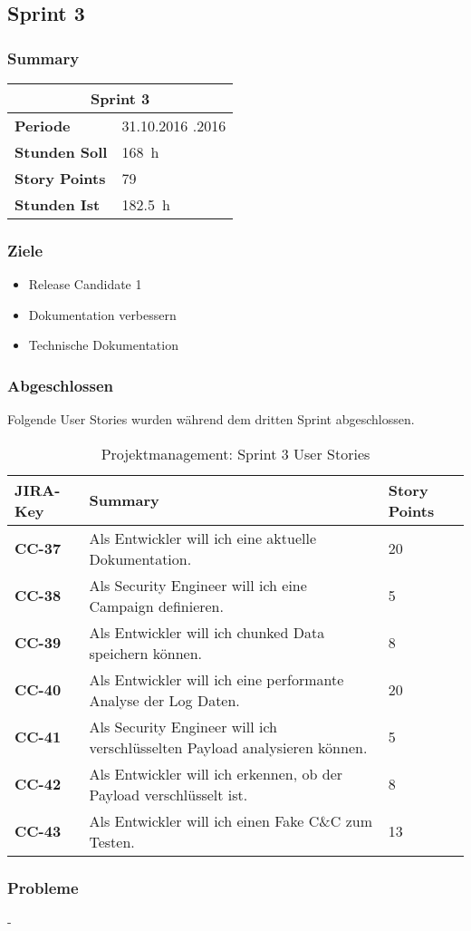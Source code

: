 \subsection{Sprint 3}

\subsubsection*{Summary}

\begin{table}[H]
	\centering
	\begin{tabular}{ll}
		\toprule
		\multicolumn{2}{c}{\textbf{Sprint 3}}\\
		\midrule
		\textbf{Periode} & 31.10.2016 \textendash 20.11.2016\\
		\textbf{Stunden Soll} & \SI{168}{\hour}\\
		\textbf{Story Points} & 79\\
		\textbf{Stunden Ist} & \SI{182,5}{\hour}\\
		\bottomrule
	\end{tabular}
\end{table}

\subsubsection*{Ziele}
\begin{itemize}
  \item Release Candidate 1
  \item Dokumentation verbessern
  \item Technische Dokumentation
\end{itemize}


\subsubsection*{Abgeschlossen}
Folgende User Stories wurden während dem dritten Sprint abgeschlossen.
\begin{table}[H]
    \centering
	\begin{tabularx}{\textwidth}{l X l}
	\toprule
	\textbf{JIRA-Key} & \textbf{Summary} & \textbf{Story Points}\\
	\midrule
      \textbf{CC-37} & Als Entwickler will ich eine aktuelle Dokumentation. & 20 \\
      \textbf{CC-38} & Als Security Engineer will ich eine Campaign definieren. & 5\\
      \textbf{CC-39} & Als Entwickler will ich chunked Data speichern können. & 8\\
      \textbf{CC-40} & Als Entwickler will ich eine performante Analyse der Log Daten. & 20 \\
      \textbf{CC-41} & Als Security Engineer will ich verschlüsselten Payload analysieren können. & 5 \\
      \textbf{CC-42} & Als Entwickler will ich erkennen, ob der Payload verschlüsselt ist. & 8\\
      \textbf{CC-43} & Als Entwickler will ich einen Fake C\&C zum Testen. & 13\\
	\bottomrule
    \end{tabularx}
    \caption{Projektmanagement: Sprint 3 User Stories}
\end{table}

\subsubsection*{Probleme}
-
